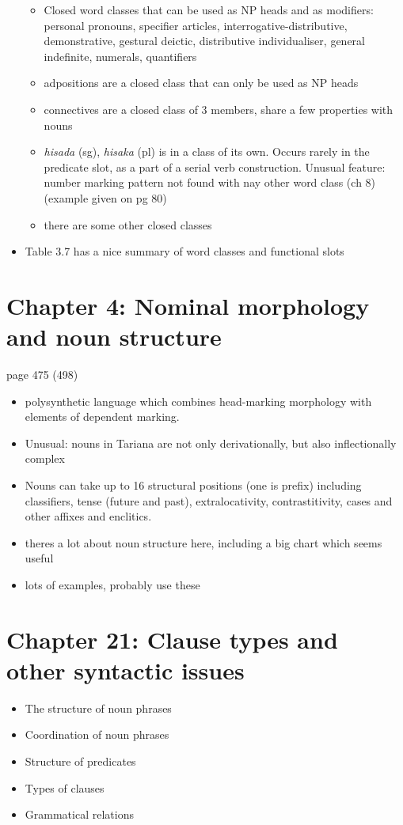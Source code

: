\documentclass{article}
\begin{document}
\begin{itemize}
	\begin{itemize}
		\item Closed word classes that can be used as NP heads and as modifiers: personal pronouns, specifier articles, interrogative-distributive, demonstrative, gestural deictic, distributive individualiser, general indefinite, numerals, quantifiers
		\item adpositions are a closed class that can only be used as NP heads
		\item connectives are a closed class of 3 members, share a few properties with nouns
		\item \emph{hisada} (sg), \emph{hisaka} (pl) is in a class of its own. Occurs rarely in the predicate slot, as a part of a serial verb construction. Unusual feature: number marking pattern not found with nay other word class (ch 8) (example given on pg 80)
		\item there are some other closed classes
	\end{itemize}
	\item Table 3.7 has a nice summary of word classes and functional slots
\end{itemize}

\section{Chapter 4: Nominal morphology and noun structure}
page 475 (498)
\begin{itemize}
	\item polysynthetic language which combines head-marking morphology with elements of dependent marking.
	\item Unusual: nouns in Tariana are not only derivationally, but also inflectionally complex
	\item Nouns can take up to 16 structural positions (one is prefix) including classifiers, tense (future and past), extralocativity, contrastitivity, cases and other affixes and enclitics.
	\item theres a lot about noun structure here, including a big chart which seems useful
	\item lots of examples, probably use these


\end{itemize}


\section{Chapter 21: Clause types and other syntactic issues}
\begin{itemize}
	\item The structure of noun phrases
	\item Coordination of noun phrases
	\item Structure of predicates
	\item Types of clauses
	\item Grammatical relations
\end{itemize}
\end{document}
